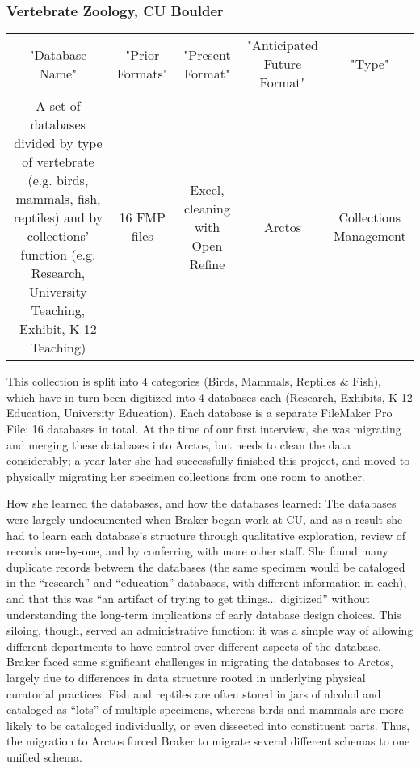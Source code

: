 \subsubsection{Vertebrate Zoology, CU Boulder}

\begin{tabular}{ c c c c c } 
    "Database Name" & "Prior Formats" & "Present Format" & "Anticipated Future Format" & "Type" \\ 
    A set of databases divided by type of vertebrate (e.g. birds, mammals, fish, reptiles) and by collections' function (e.g. Research, University Teaching, Exhibit, K-12 Teaching) & 16 FMP files & Excel, cleaning with Open Refine & Arctos & Collections Management \\ 
\end{tabular}

This collection is split into 4 categories (Birds, Mammals, Reptiles & Fish), which have in turn been digitized into 4 databases each (Research, Exhibits, K-12 Education, University Education). Each database is a separate FileMaker Pro File; 16 databases in total.  At the time of our first interview, she was migrating and merging these databases into Arctos, but needs to clean the data considerably; a year later she had successfully finished this project, and moved to physically migrating her specimen collections from one room to another.

How she learned the databases, and how the databases learned: The databases were largely undocumented when Braker began work at CU, and as a result she had to learn each database’s structure through qualitative exploration, review of records one-by-one, and by conferring with more other staff.  She found many duplicate records between the databases (the same specimen would be cataloged in the “research” and “education” databases, with different information in each), and that this was “an artifact of trying to get things... digitized” without understanding the long-term implications of early database design choices.   This siloing, though, served an administrative function: it was a simple way of allowing different departments to have control over different aspects of the database.  Braker faced some significant challenges in migrating the databases to Arctos, largely due to differences in data structure rooted in underlying physical curatorial practices.  Fish and reptiles are often stored in jars of alcohol and cataloged as “lots” of multiple specimens, whereas birds and mammals are more likely to be cataloged individually, or even dissected into constituent parts.  Thus, the migration to Arctos forced Braker to migrate several different schemas to one unified schema.

